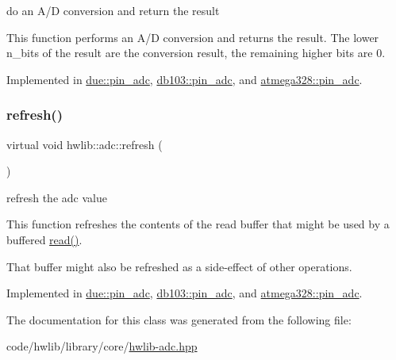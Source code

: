 do an A/D conversion and return the result

This function performs an A/D conversion and returns the result. The lower n\+\_\+bits of the result are the conversion result, the remaining higher bits are 0. 

Implemented in \hyperlink{classdue_1_1pin__adc_a3b562b594bbbe3e8815a9223fa6520cc}{due\+::pin\+\_\+adc}, \hyperlink{classdb103_1_1pin__adc_a2eca8e0a04be08ab585325d27ff93d64}{db103\+::pin\+\_\+adc}, and \hyperlink{classatmega328_1_1pin__adc_a4017fd7e32de94fc9e895cd9e9346430}{atmega328\+::pin\+\_\+adc}.

\mbox{\label{classhwlib_1_1adc_a5484571b18d647ec78ba97e94c7ed836}} 
\subsubsection{\texorpdfstring{refresh()}{refresh()}}
{\footnotesize\ttfamily virtual void hwlib\+::adc\+::refresh (\begin{DoxyParamCaption}{ }\end{DoxyParamCaption})\hspace{0.3cm}{\ttfamily [pure virtual]}}

refresh the adc value

This function refreshes the contents of the read buffer that might be used by a buffered \hyperlink{classhwlib_1_1adc_ac39b506d3ae4eec08caa5aa7e69ab2fb}{read()}.

That buffer might also be refreshed as a side-\/effect of other operations. 

Implemented in \hyperlink{classdue_1_1pin__adc_ab30deacf575e1ef59af13aea24f77584}{due\+::pin\+\_\+adc}, \hyperlink{classdb103_1_1pin__adc_aff62b5768df51a17f01d416002586e86}{db103\+::pin\+\_\+adc}, and \hyperlink{classatmega328_1_1pin__adc_af71ffd74aacbf0aac5f6693a065896a2}{atmega328\+::pin\+\_\+adc}.



The documentation for this class was generated from the following file\+:\begin{DoxyCompactItemize}
\item 
code/hwlib/library/core/\hyperlink{hwlib-adc_8hpp}{hwlib-\/adc.\+hpp}\end{DoxyCompactItemize}
